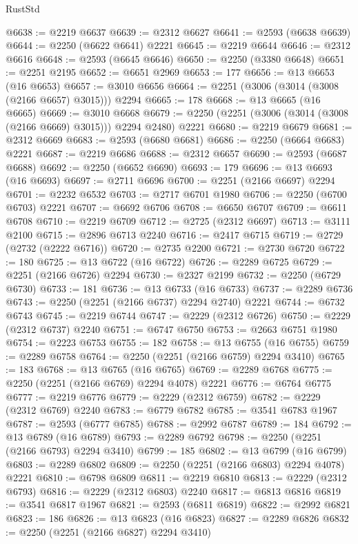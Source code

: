 \begin{lexlean}{RustStd}
\begin{coremodule}
{\begin{coremodule}
{{{{{{{{{{{{{{{{{{{{{{{{{{{{{{{{{{{{{{{{{{{{{{{{{{{{{@6638 := @2219 @6637
@6639 := @2312 @6627
@6641 := @2593 (@6638 @6639)
@6644 := @2250 (@6622 @6641) @2221
@6645 := @2219 @6644
@6646 := @2312 @6616
@6648 := @2593 (@6645 @6646)
@6650 := @2250 (@3380 @6648)
@6651 := @2251 @2195
@6652 := @6651 @2969
@6653 := 177
@6656 := @13 @6653 (@16 @6653)
@6657 := @3010 @6656
@6664 := @2251 (@3006 (@3014 (@3008 (@2166 @6657) @3015))) @2294
@6665 := 178
@6668 := @13 @6665 (@16 @6665)
@6669 := @3010 @6668
@6679 := @2250 (@2251 (@3006 (@3014 (@3008 (@2166 @6669) @3015))) @2294 @2480) @2221
@6680 := @2219 @6679
@6681 := @2312 @6669
@6683 := @2593 (@6680 @6681)
@6686 := @2250 (@6664 @6683) @2221
@6687 := @2219 @6686
@6688 := @2312 @6657
@6690 := @2593 (@6687 @6688)
@6692 := @2250 (@6652 @6690)
@6693 := 179
@6696 := @13 @6693 (@16 @6693)
@6697 := @2711 @6696
@6700 := @2251 (@2166 @6697) @2294
@6701 := @2232 @6532
@6703 := @2717 @6701 @1980
@6706 := @2250 (@6700 @6703) @2221
@6707 := @6692 @6706
@6708 := @6650 @6707
@6709 := @6611 @6708
@6710 := @2219 @6709
@6712 := @2725 (@2312 @6697)
@6713 := @3111 @2100
@6715 := @2896 @6713 @2240
@6716 := @2417 @6715
@6719 := @2729 (@2732 (@2222 @6716))
@6720 := @2735 @2200
@6721 := @2730 @6720
@6722 := 180
@6725 := @13 @6722 (@16 @6722)
@6726 := @2289 @6725
@6729 := @2251 (@2166 @6726) @2294
@6730 := @2327 @2199
@6732 := @2250 (@6729 @6730)
@6733 := 181
@6736 := @13 @6733 (@16 @6733)
@6737 := @2289 @6736
@6743 := @2250 (@2251 (@2166 @6737) @2294 @2740) @2221
@6744 := @6732 @6743
@6745 := @2219 @6744
@6747 := @2229 (@2312 @6726)
@6750 := @2229 (@2312 @6737) @2240
@6751 := @6747 @6750
@6753 := @2663 @6751 @1980
@6754 := @2223 @6753
@6755 := 182
@6758 := @13 @6755 (@16 @6755)
@6759 := @2289 @6758
@6764 := @2250 (@2251 (@2166 @6759) @2294 @3410)
@6765 := 183
@6768 := @13 @6765 (@16 @6765)
@6769 := @2289 @6768
@6775 := @2250 (@2251 (@2166 @6769) @2294 @4078) @2221
@6776 := @6764 @6775
@6777 := @2219 @6776
@6779 := @2229 (@2312 @6759)
@6782 := @2229 (@2312 @6769) @2240
@6783 := @6779 @6782
@6785 := @3541 @6783 @1967
@6787 := @2593 (@6777 @6785)
@6788 := @2992 @6787
@6789 := 184
@6792 := @13 @6789 (@16 @6789)
@6793 := @2289 @6792
@6798 := @2250 (@2251 (@2166 @6793) @2294 @3410)
@6799 := 185
@6802 := @13 @6799 (@16 @6799)
@6803 := @2289 @6802
@6809 := @2250 (@2251 (@2166 @6803) @2294 @4078) @2221
@6810 := @6798 @6809
@6811 := @2219 @6810
@6813 := @2229 (@2312 @6793)
@6816 := @2229 (@2312 @6803) @2240
@6817 := @6813 @6816
@6819 := @3541 @6817 @1967
@6821 := @2593 (@6811 @6819)
@6822 := @2992 @6821
@6823 := 186
@6826 := @13 @6823 (@16 @6823)
@6827 := @2289 @6826
@6832 := @2250 (@2251 (@2166 @6827) @2294 @3410)
}}}}}}}}}}}}}}}}}}}}}}}}}}}}}}}}}}}}}}}}}}}}}}}}}}}}}
\end{coremodule}}
\end{coremodule}
\end{lexlean}
